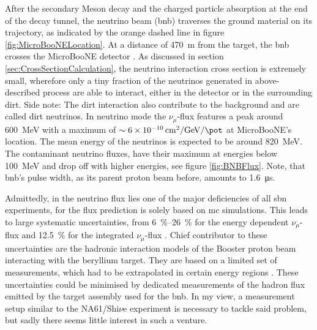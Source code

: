 After the secondary \gls{Meson} decay and the charged particle absorption at the end of the decay tunnel, the neutrino beam (\gls{bnb}) traverses the ground material on its trajectory, as indicated by the orange dashed line in figure \ref{fig:MicroBooNELocation}. At a distance of \SI{470}{\metre} from the target, the \gls{bnb} crosses the MicroBooNE detector \cite{MicroBooNEDetector}. As discussed in section \ref{sec:CrossSectionCalculation}, the neutrino interaction cross section is extremely small, wherefore only a tiny fraction of the neutrinos generated in above-described process are able to interact, either in the detector or in the surrounding dirt. Side note: The dirt interaction also contribute to the background and are called dirt neutrinos. In neutrino mode the $\nu_\mu$-flux features a peak around \SI{600}{\mega\electronvolt} with a maximum of $\sim \SI{6e-10}{\per\centi\metre\squared\per\giga\electronvolt\per\pot}$ at MicroBooNE's location. The mean energy of the neutrinos is expected to be around \SI{820}{\mega\electronvolt}. The contaminant neutrino fluxes, have their maximum at energies below \SI{100}{\mega\electronvolt} and drop off with higher energies, see figure \ref{fig:BNBFlux}. Note, that \gls{bnb}'s pulse width, as its parent proton beam before, amounts to \SI{1.6}{\micro\second}.

Admittedly, in the neutrino flux lies one of the major deficiencies of all \gls{sbn} experiments, for the flux prediction is solely based on \gls{mc} simulations. This leads to large systematic uncertainties, \ie from \SIrange{6}{26}{\percent} for the energy dependent $\nu_\mu$-flux and \SI{12.5}{\percent} for the integrated $\nu_\mu$-flux \cite{BNBBeamUncertainty}. Chief contributor to these uncertainties are the hadronic interaction models of the Booster proton beam interacting with the beryllium target. They are based on a limited set of measurements, which had to be extrapolated in certain energy regions \cite{BNBBeamFlux}. These uncertainties could be minimised by dedicated measurements of the hadron flux emitted by the target assembly used for the \gls{bnb}. In my view, a measurement setup similar to the NA61/Shi$\nu$e experiment \cite{NA61Shine} is necessary to tackle said problem, but sadly there seems little interest in such a venture.

